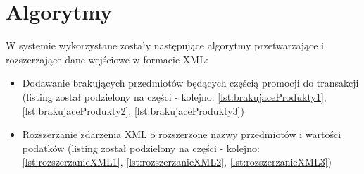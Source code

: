 \documentclass[a4paper]{book}
\begin{document}
\section{Algorytmy}
W systemie wykorzystane zostały następujące algorytmy przetwarzające i rozszerzające dane wejściowe w formacie XML:
\begin{itemize}
	\item Dodawanie brakujących przedmiotów będących częścią promocji do transakcji (listing został podzielony na części - kolejno: \ref{lst:brakujaceProdukty1}, \ref{lst:brakujaceProdukty2}, \ref{lst:brakujaceProdukty3})
	\item Rozszerzanie zdarzenia XML o rozszerzone nazwy przedmiotów i wartości podatków (listing został podzielony na części - kolejno: \ref{lst:rozszerzanieXML1}, \ref{lst:rozszerzanieXML2}, \ref{lst:rozszerzanieXML3})
\end{itemize}
\end{document}
